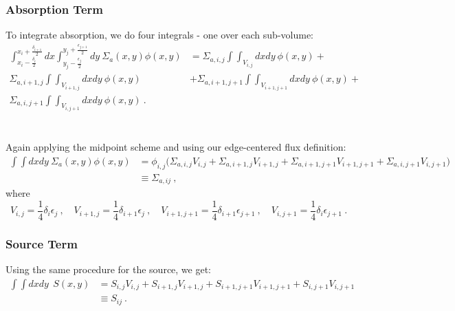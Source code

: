 \documentclass[12pt]{exam}
\begin{document}
\subsubsection*{Absorption Term}
To integrate absorption, we do four integrals - one over each sub-volume:
%
\ifprintanswers
\begin{align}
\int_{x_i-\frac{\delta_{i}}{2}}^{x_i+\frac{\delta_{i+1}}{2}} dx \int_{y_j-\frac{\epsilon_{j}}{2}}^{y_j+\frac{\epsilon_{j+1}}{2}}dy\:\Sigma_a(x,y) \phi(x,y) &= \Sigma_{a,i,j}\int\int_{V_{i,j}} dx dy \: \phi(x,y) + \nonumber \\
%
\Sigma_{a,i+1,j}\int\int_{V_{i+1,j}} dx dy \: \phi(x,y) &+ \Sigma_{a,i+1,j+1}\int\int_{V_{i+1,j+1}} dx dy \: \phi(x,y) + \nonumber \\
 \Sigma_{a,i,j+1}\int\int_{V_{i,j+1}} dx dy \: \phi(x,y) \:.\nonumber
\end{align}
\else
\\ \vspace*{8em}\\
\fi
%
Again applying the midpoint scheme and using our edge-centered flux definition:
%
\begin{align}
\int \int dx dy\:\Sigma_a(x,y) \phi(x,y) &= \boxed{\phi_{i,j}\bigl(\Sigma_{a,i,j} V_{i,j} + \Sigma_{a,i+1,j} V_{i+1,j} + \Sigma_{a,i+1,j+1} V_{i+1,j+1} + \Sigma_{a,i,j+1} V_{i,j+1} \bigr) } \nonumber \\
&\equiv \Sigma_{a,ij}\:, \nonumber
\end{align}
%
where
\[V_{i,j} = \frac{1}{4}\delta_i \epsilon_j \:, \quad V_{i+1,j} = \frac{1}{4}\delta_{i+1} \epsilon_{j} \:, \quad V_{i+1,j+1} = \frac{1}{4}\delta_{i+1} \epsilon_{j+1} \:, \quad V_{i,j+1} = \frac{1}{4}\delta_{i} \epsilon_{j+1} \:.\]


\subsubsection*{Source Term}
Using the same procedure for the source, we get:
\begin{align}
\int \int dx dy \: \:S(x,y) &= \boxed{ S_{i,j} V_{i,j} + S_{i+1,j} V_{i+1,j} + S_{i+1,j+1} V_{i+1,j+1} + S_{i,j+1} V_{i,j+1} }\nonumber \\
&\equiv S_{ij}\:. \nonumber
\end{align}


\end{document}
